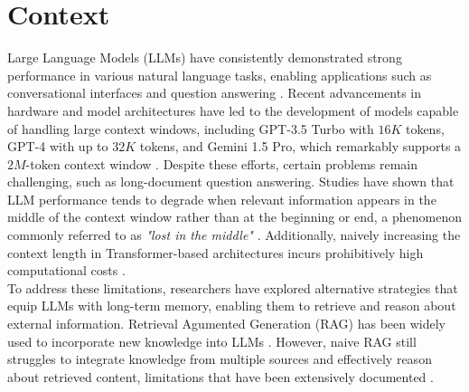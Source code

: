 \section{Context}
\label{sec:context}

Large Language Models (LLMs) have consistently demonstrated strong performance in various natural language tasks, enabling applications such as conversational interfaces and question answering \cite{minaee2024largelanguagemodelssurvey}. Recent advancements in hardware and model architectures have led to the development of models capable of handling large context windows, including GPT-3.5 Turbo with $16K$ tokens, GPT-4 with up to $32K$ tokens, and Gemini 1.5 Pro, which remarkably supports a $2M$-token context window
\cite{liu2023lostmiddlelanguagemodels}\cite{openai2024gpt4technicalreport}\cite{geminiteam2024gemini15unlockingmultimodal}. Despite these efforts, certain problems remain challenging, such as long-document question answering. Studies have shown that LLM performance tends to degrade when relevant information appears in the middle of the context window rather than at the beginning or end, a phenomenon commonly referred to as \textit{"lost in the middle"} \cite{liu2023lostmiddlelanguagemodels}. Additionally, naively increasing the context length in Transformer-based architectures incurs prohibitively high computational costs \cite{kitaev2020reformerefficienttransformer}.\\

\noindent To address these limitations, researchers have explored alternative strategies that equip LLMs with long-term memory, enabling them to retrieve and reason about external information. Retrieval Agumented Generation (RAG) has been widely used to incorporate new knowledge into LLMs \cite{lewis2021retrievalaugmentedgenerationknowledgeintensivenlp}. However, naive RAG still struggles to integrate knowledge from multiple sources and effectively reason about retrieved content, limitations that have been extensively documented \cite{NEURIPS2024_6ddc001d}\cite{liang2024kagboostingllmsprofessional}. \\

